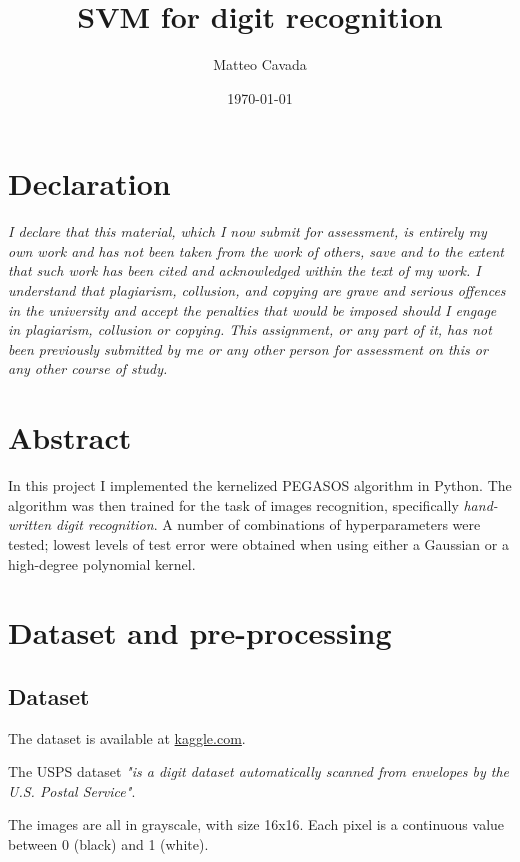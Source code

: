 \documentclass[a4paper]{article}
\author{Matteo Cavada}
\date{\today}
\title{SVM for digit recognition}
\begin{document}
\maketitle
\tableofcontents


\section{Declaration}
\label{sec:orge5bc9ad}

\emph{I declare that this material, which I now submit for assessment, is entirely my own work and has not been taken from the work of others, save and to the extent that such work has been cited and acknowledged within the text of my work. I understand that plagiarism, collusion, and copying are grave and serious offences in the university and accept the penalties that would be imposed should I engage in plagiarism, collusion or copying. This assignment, or any part of it, has not been previously submitted by me or any other person for assessment on this or any other course of study.}

\section{Abstract}
\label{sec:org0c737e4}

In this project I implemented the kernelized PEGASOS algorithm in Python. The algorithm was then trained for the task of images recognition, specifically \emph{hand-written digit recognition}. A number of combinations of hyperparameters were tested; lowest levels of test error were obtained when using either a Gaussian or a high-degree polynomial kernel.

\section{Dataset and pre-processing}
\label{sec:org10cf53e}

\subsection{Dataset}
\label{sec:org4a39236}

The dataset is available at \href{https://www.kaggle.com/datasets/bistaumanga/usps-dataset}{kaggle.com}.

The USPS dataset \cite{uspsdataset} \emph{"is a digit dataset automatically scanned from envelopes by the U.S. Postal Service"}.

The images are all in grayscale, with size 16x16. Each pixel is a continuous value between 0 (black) and 1 (white).
\end{document}
